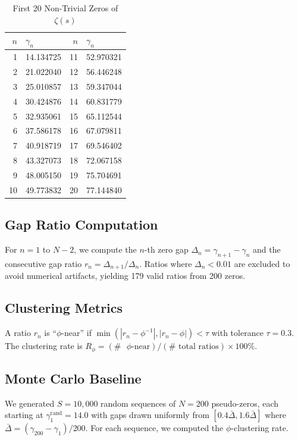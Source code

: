 \documentclass[11pt,a4paper]{article}
\begin{document}
\begin{table}[H]
\centering
\caption{First 20 Non-Trivial Zeros of $\zeta(s)$}
\label{tab:zeros20}
\begin{tabular}{@{}rlrl@{}}
\toprule
$n$ & $\gamma_n$ & $n$ & $\gamma_n$ \\
\midrule
1  & 14.134725 & 11 & 52.970321 \\
2  & 21.022040 & 12 & 56.446248 \\
3  & 25.010857 & 13 & 59.347044 \\
4  & 30.424876 & 14 & 60.831779 \\
5  & 32.935061 & 15 & 65.112544 \\
6  & 37.586178 & 16 & 67.079811 \\
7  & 40.918719 & 17 & 69.546402 \\
8  & 43.327073 & 18 & 72.067158 \\
9  & 48.005150 & 19 & 75.704691 \\
10 & 49.773832 & 20 & 77.144840 \\
\bottomrule
\end{tabular}
\end{table}

\subsection{Gap Ratio Computation}

For $n = 1$ to $N-2$, we compute the $n$-th zero gap $\Delta_n = \gamma_{n+1} - \gamma_n$ and the consecutive gap ratio $r_n = \Delta_{n+1} / \Delta_n$. Ratios where $\Delta_n < 0.01$ are excluded to avoid numerical artifacts, yielding 179 valid ratios from 200 zeros.

\subsection{Clustering Metrics}

A ratio $r_n$ is ``$\phi$-near'' if $\min(|r_n - \phi^{-1}|, |r_n - \phi|) < \tau$ with tolerance $\tau = 0.3$. The clustering rate is $R_\phi = (\#\text{ $\phi$-near}) / (\#\text{ total ratios}) \times 100\%$.

\subsection{Monte Carlo Baseline}

We generated $S = 10{,}000$ random sequences of $N = 200$ pseudo-zeros, each starting at $\gamma_1^{\text{rand}} = 14.0$ with gaps drawn uniformly from $[0.4\bar{\Delta}, 1.6\bar{\Delta}]$ where $\bar{\Delta} = (\gamma_{200} - \gamma_1)/200$. For each sequence, we computed the $\phi$-clustering rate.
\end{document}
